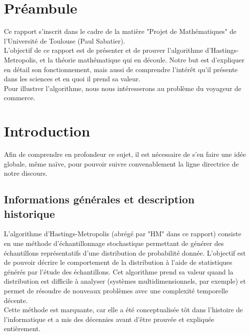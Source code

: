 \documentclass{article}
\begin{document}
\newpage
{}  %
\setcounter{page}{1}    %

\section*{Préambule}

Ce rapport s'inscrit dans le cadre de la matière "Projet de Mathématiques" de l'Université de Toulouse (Paul Sabatier). \\
L'objectif de ce rapport est de présenter et de prouver l'algorithme d'Hastings-Metropolis, et la théorie mathématique qui en découle.
Notre but est d'expliquer en détail son fonctionnement, mais aussi de comprendre l'intérêt qu'il présente dans les sciences et en quoi il prend sa valeur. \\
Pour illustrer l'algorithme, nous nous intéresserons au problème du voyageur de commerce.


\section{Introduction}

Afin de comprendre en profondeur ce sujet, il est nécessaire de s'en faire une idée globale, même naïve, pour pouvoir suivre convenablement la ligne directrice de notre discours.

\subsection{Informations générales et description historique}

L'algorithme d'Hastings-Metropolis (abrégé par "HM" dans ce rapport) consiste en une méthode d'échantillonnage stochastique permettant de générer des échantillons représentatifs d'une distribution de probabilité donnée. L'objectif est de pouvoir décrire le comportement de la distribution à l'aide de statistiques générés par l'étude des échantillons.
Cet algorithme prend sa valeur quand la distribution est difficile à analyser (systèmes multidimensionnels, par exemple) et permet de résoudre de nouveaux problèmes avec une complexité temporelle décente. \\
Cette méthode est marquante, car elle a été conceptualisée tôt dans l'histoire de l'informatique et a mis des décennies avant d'être prouvée et expliquée entièrement. \\
\end{document}
